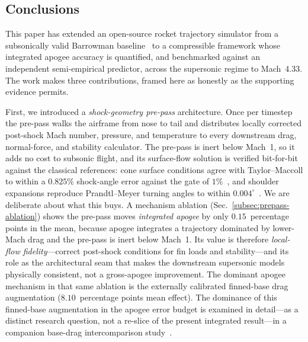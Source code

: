 
\subsection{Conclusions}

This paper has extended an open-source rocket trajectory simulator from a
subsonically valid Barrowman baseline~\cite{barrowman1967,niskanen2009} to a
compressible framework whose integrated apogee accuracy is quantified, and
benchmarked against an independent semi-empirical predictor, across the
supersonic regime to Mach~4.33. The work makes three contributions, framed here
as honestly as the supporting evidence permits.

First, we introduced a \emph{shock-geometry pre-pass} architecture. Once per
timestep the pre-pass walks the airframe from nose to tail and distributes
locally corrected post-shock Mach number, pressure, and temperature to every
downstream drag, normal-force, and stability calculator. The pre-pass is inert
below Mach~1, so it adds no cost to subsonic flight, and its surface-flow
solution is verified bit-for-bit against the classical references: cone
surface conditions agree with Taylor--Maccoll to within a $0.825\%$ shock-angle
error against the gate of $1\%$~\cite{taylormaccoll1933}, and shoulder
expansions reproduce Prandtl--Meyer turning angles to within
$0.004^{\circ}$~\cite{naca1135}. We are deliberate about what this buys. A
mechanism ablation (Sec.~\ref{subsec:prepass-ablation}) shows the pre-pass moves
\emph{integrated apogee} by only $0.15$~percentage points in the mean, because
apogee integrates a trajectory dominated by lower-Mach drag and the pre-pass is
inert below Mach~1. Its value is therefore \emph{local-flow fidelity}---correct
post-shock conditions for fin loads and stability---and its role as the
architectural seam that makes the downstream supersonic models physically
consistent, not a gross-apogee improvement. The dominant apogee mechanism in
that same ablation is the externally calibrated finned-base drag augmentation
($8.10$~percentage points mean effect). The dominance of this finned-base
augmentation in the apogee error budget is examined in detail---as a distinct
research question, not a re-slice of the present integrated result---in a
companion base-drag intercomparison study~\cite{yu2026ast}.

